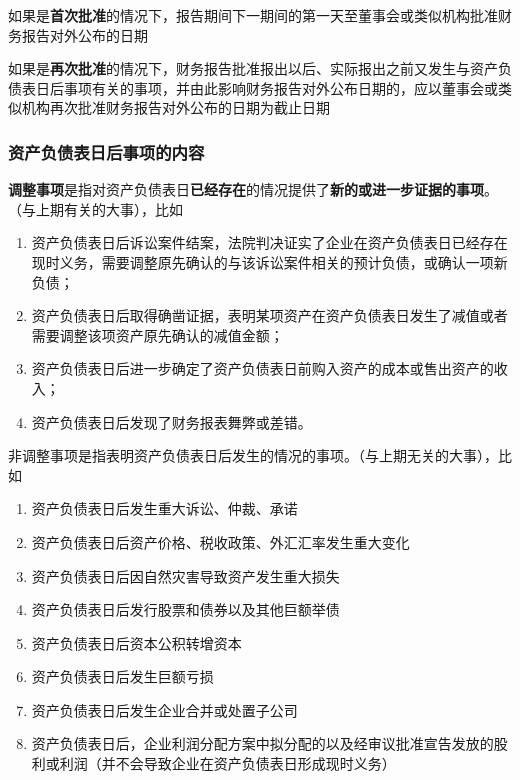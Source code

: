 \documentclass[UTF8,12pt]{ctexart}
\numberwithin{equation}{section} %
\numberwithin{figure}{section}
\numberwithin{table}{section}
\begin{document}
	如果是\textbf{首次批准}的情况下，报告期间下一期间的第一天至董事会或类似机构批准财务报告对外公布的日期
	
	如果是\textbf{再次批准}的情况下，财务报告批准报出以后、实际报出之前又发生与资产负债表日后事项有关的事项，并由此影响财务报告对外公布日期的，应以董事会或类似机构再次批准财务报告对外公布的日期为截止日期
	
	
	\subsubsection{资产负债表日后事项的内容}
	\textbf{调整事项}是指对资产负债表日\textbf{已经存在}的情况提供了\textbf{新的或进一步证据的事项}。（与上期有关的大事），比如
	\begin{enumerate}
		\item 资产负债表日后诉讼案件结案，法院判决证实了企业在资产负债表日已经存在现时义务，需要调整原先确认的与该诉讼案件相关的预计负债，或确认一项新负债；
		
		\item 资产负债表日后取得确凿证据，表明某项资产在资产负债表日发生了减值或者需要调整该项资产原先确认的减值金额；
		
		\item 资产负债表日后进一步确定了资产负债表日前购入资产的成本或售出资产的收入；
		
		\item 资产负债表日后发现了财务报表舞弊或差错。
	\end{enumerate}
	
	非调整事项是指表明资产负债表日后发生的情况的事项。（与上期无关的大事），比如
	\begin{enumerate}
		\item 资产负债表日后发生重大诉讼、仲裁、承诺
		
		\item 资产负债表日后资产价格、税收政策、外汇汇率发生重大变化
		
		\item 资产负债表日后因自然灾害导致资产发生重大损失
		
		\item 资产负债表日后发行股票和债券以及其他巨额举债
		
		\item 资产负债表日后资本公积转增资本
		
		\item 资产负债表日后发生巨额亏损
		
		\item 资产负债表日后发生企业合并或处置子公司
		
		\item 资产负债表日后，企业利润分配方案中拟分配的以及经审议批准宣告发放的股利或利润（并不会导致企业在资产负债表日形成现时义务）
	\end{enumerate}
	
\end{document}
